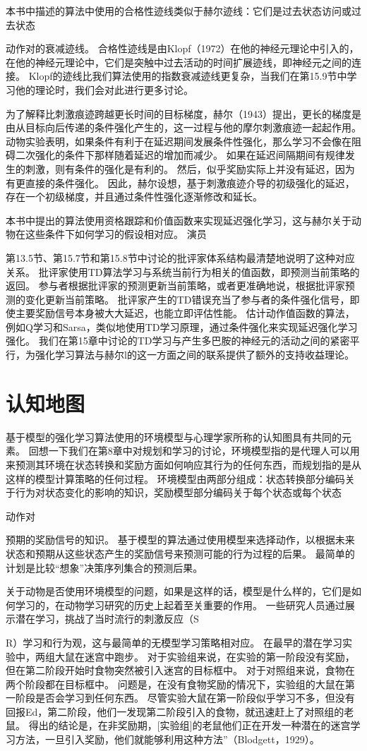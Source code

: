 {本书中描述的算法中使用的合格性迹线类似于赫尔迹线：它们是过去状态访问或过去状态{动作对的衰减迹线。
合格性迹线是由Klopf（1972）在他的神经元理论中引入的，在他的神经元理论中，它们是突触中过去活动的时间扩展迹线，即神经元之间的连接。
Klopf的迹线比我们算法使用的指数衰减迹线更复杂，当我们在第15.9节中学习他的理论时，我们会对此进行更多讨论。


为了解释比刺激痕迹跨越更长时间的目标梯度，赫尔（1943）提出，更长的梯度是由从目标向后传递的条件强化产生的，这一过程与他的摩尔刺激痕迹一起起作用。
动物实验表明，如果条件有利于在延迟期间发展条件性强化，那么学习不会像在阻碍二次强化的条件下那样随着延迟的增加而减少。
如果在延迟间隔期间有规律发生的刺激，则有条件的强化是有利的。
然后，似乎奖励实际上并没有延迟，因为有更直接的条件强化。
因此，赫尔设想，基于刺激痕迹介导的初级强化的延迟，存在一个初级梯度，并且通过条件性强化逐渐修改和延长。


本书中提出的算法使用资格跟踪和价值函数来实现延迟强化学习，这与赫尔关于动物在这些条件下如何学习的假设相对应。
演员{第13.5节、第15.7节和第15.8节中讨论的批评家体系结构最清楚地说明了这种对应关系。
批评家使用TD算法学习与系统当前行为相关的值函数，即预测当前策略的返回。
参与者根据批评家的预测更新当前策略，或者更准确地说，根据批评家预测的变化更新当前策略。
批评家产生的TD错误充当了参与者的条件强化信号，即使主要奖励信号本身被大大延迟，也能立即评估性能。
估计动作值函数的算法，例如Q学习和Sarsa，类似地使用TD学习原理，通过条件强化来实现延迟强化学习强化。
我们在第15章中讨论的TD学习与产生多巴胺的神经元的活动之间的紧密平行，为强化学习算法与赫尔l的这一方面之间的联系提供了额外的支持收益理论。


\section{认知地图} \label{sec:cognitive_maps}

基于模型的强化学习算法使用的环境模型与心理学家所称的认知图具有共同的元素。
回想一下我们在第8章中对规划和学习的讨论，环境模型指的是代理人可以用来预测其环境在状态转换和奖励方面如何响应其行为的任何东西，而规划指的是从这样的模型计算策略的任何过程。
环境模型由两部分组成：状态转换部分编码关于行为对状态变化的影响的知识，奖励模型部分编码关于每个状态或每个状态{动作对{预期的奖励信号的知识。
基于模型的算法通过使用模型来选择动作，以根据未来状态和预期从这些状态产生的奖励信号来预测可能的行为过程的后果。
最简单的计划是比较“想象”决策序列集合的预测后果。


关于动物是否使用环境模型的问题，如果是这样的话，模型是什么样的，它们是如何学习的，在动物学习研究的历史上起着至关重要的作用。
一些研究人员通过展示潜在学习，挑战了当时流行的刺激反应（S{R）学习和行为观，这与最简单的无模型学习策略相对应。
在最早的潜在学习实验中，两组大鼠在迷宫中跑步。
对于实验组来说，在实验的第一阶段没有奖励，但在第二阶段开始时食物突然被引入迷宫的目标框中。
对于对照组来说，食物在两个阶段都在目标框中。
问题是，在没有食物奖励的情况下，实验组的大鼠在第一阶段是否会学习到任何东西。
尽管实验大鼠在第一阶段似乎学习不多，但没有回报Ed，第二阶段，他们一发现第二阶段引入的食物，就迅速赶上了对照组的老鼠。
得出的结论是，在非奖励期，[实验组]的老鼠他们正在开发一种潜在的迷宫学习方法，一旦引入奖励，他们就能够利用这种方法”（Blodgett，1929）。



}}}}}}
